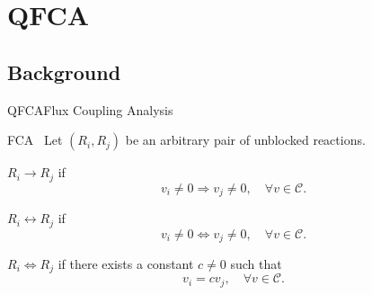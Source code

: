 \documentclass[10pt]{beamer}
\theoremstyle{remark}
\theoremstyle{definition}
\begin{document}
\section{QFCA}
\subsection{Background}
\begin{frame}{QFCA}{Flux Coupling Analysis}
  \begin{block}{FCA~\cite{burgard2004flux}}
  Let $(R_i,R_j)$ be an arbitrary pair of unblocked reactions.
	\begin{description}
		\item<2->[Directional Coupling:] $R_i \longrightarrow R_j$ if 
        \[v_i \neq 0 \Rightarrow v_j \neq 0,\quad\forall v \in \mathcal{C}.\]
		\item<3->[Partial Coupling:] $R_i \longleftrightarrow R_j$ if
        \[v_i \neq 0 \Leftrightarrow v_j \neq 0,\quad\forall v \in \mathcal{C}.\]
		\item<4->[Full Coupling:] $R_i \Longleftrightarrow R_j$ if there exists a constant
        $c\neq0$ such that \[v_i = c v_j,\quad\forall v \in \mathcal{C}.\] 
	\end{description}
  \end{block}
\end{frame}
\end{document}

